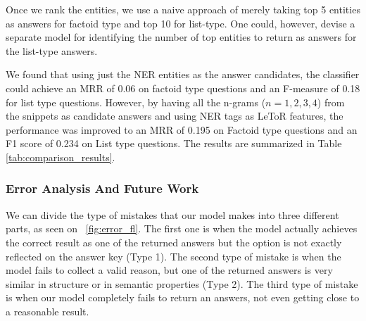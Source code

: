 

Once we rank the entities, we use a naive approach of merely taking top 5 entities as answers for factoid type and top 10 for list-type. One could, however, devise a separate model for identifying the number of top entities to return as answers for the list-type answers. 

We found that using just the NER entities as the answer candidates, the classifier could achieve an MRR of 0.06 on factoid type questions and an F-measure of 0.18 for list type questions. However, by having all the n-grams ($n = 1, 2, 3, 4$) from the snippets as candidate answers and using NER tags as LeToR features, the performance was improved to an MRR of 0.195 on Factoid type questions and an F1 score of 0.234  on List type questions. The results are summarized in Table \ref{tab:comparison_results}.


\subsubsection{Error Analysis And Future Work}

We can divide the type of mistakes that our model makes into three different parts, as seen on ~\ref{fig:error_fl}. The first one is when the model actually achieves the correct result as one of the returned answers but the option is not exactly reflected on the answer key (Type 1). The second type of mistake is when the model fails to collect a valid reason, but one of the returned answers is very similar in structure or in semantic properties (Type 2). The third type of mistake is when our model completely fails to return an answers, not even getting close to a reasonable result.

